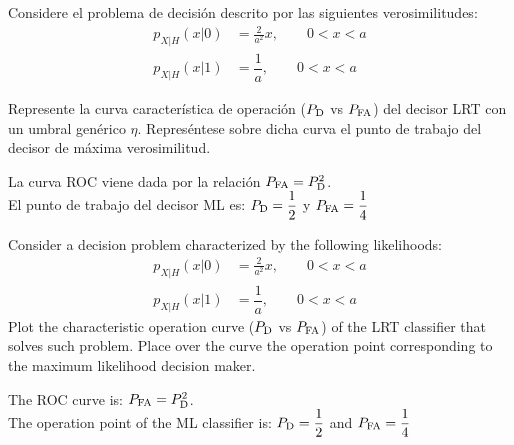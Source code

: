 \question 

\ifspanish

Considere el problema de decisión descrito por las siguientes verosimilitudes:
\begin{align*} 
p_{X|H}(x|0) &= \frac{2}{a^2} x, \qquad  0<x<a \\
p_{X|H}(x|1) &= \dfrac{1}{a},    \qquad  0<x<a
\end{align*}

Represente la curva característica de operación ($P_{\rm D}$ vs $P_{\rm FA}$) del decisor LRT con un umbral genérico $\eta$. Represéntese sobre dicha curva el punto de trabajo del decisor de máxima verosimilitud.

\begin{solution}
La curva ROC viene dada por la relación $P_{\rm FA}=P_{\rm D}^2$. \\
El punto de trabajo del decisor ML es: $P_{\rm D}=\displaystyle \frac{1}{2}$ y  $P_{\rm FA}=\dfrac{1}{4}$
\end{solution}

\else

Consider a decision problem characterized by the following likelihoods:
\begin{align*} 
p_{X|H}(x|0) &= \frac{2}{a^2} x, \qquad  0<x<a \\
p_{X|H}(x|1) &= \dfrac{1}{a},    \qquad  0<x<a
\end{align*}
Plot the characteristic operation curve ($P_{\rm D}$ vs $P_{\rm FA}$) of the LRT classifier that solves such problem. Place over the curve the operation point corresponding to the maximum likelihood decision maker.

\begin{solution}
The ROC curve is: $P_{\rm FA}=P_{\rm D}^2$. \\
The operation point of the ML classifier is: $P_{\rm D}=\displaystyle \frac{1}{2}$ and  $P_{\rm FA}=\dfrac{1}{4}$
\end{solution}

\fi